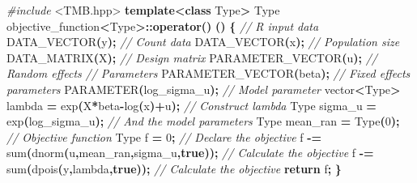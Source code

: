 \documentclass[preprint, 3p, authoryear]{elsarticle} %
\newenvironment{Shaded}{\begin{snugshade}}{\end{snugshade}}
\newcommand{\CommentTok}[1]{\textcolor[rgb]{0.56,0.35,0.01}{\textit{#1}}}
\newcommand{\ControlFlowTok}[1]{\textcolor[rgb]{0.13,0.29,0.53}{\textbf{#1}}}
\newcommand{\DecValTok}[1]{\textcolor[rgb]{0.00,0.00,0.81}{#1}}
\newcommand{\ImportTok}[1]{#1}
\newcommand{\KeywordTok}[1]{\textcolor[rgb]{0.13,0.29,0.53}{\textbf{#1}}}
\newcommand{\NormalTok}[1]{#1}
\newcommand{\OperatorTok}[1]{\textcolor[rgb]{0.81,0.36,0.00}{\textbf{#1}}}
\newcommand{\PreprocessorTok}[1]{\textcolor[rgb]{0.56,0.35,0.01}{\textit{#1}}}
\begin{document}
\begin{Shaded}
\begin{Highlighting}[]
\PreprocessorTok{\#include }\ImportTok{\textless{}TMB.hpp\textgreater{}}
\KeywordTok{template}\OperatorTok{\textless{}}\KeywordTok{class}\NormalTok{ Type}\OperatorTok{\textgreater{}}
\NormalTok{Type objective\_function}\OperatorTok{\textless{}}\NormalTok{Type}\OperatorTok{\textgreater{}::}\KeywordTok{operator}\OperatorTok{()} \OperatorTok{()}
\OperatorTok{\{}
  \CommentTok{// R input data}
\NormalTok{  DATA\_VECTOR}\OperatorTok{(}\NormalTok{y}\OperatorTok{);}                               \CommentTok{// Count data}
\NormalTok{  DATA\_VECTOR}\OperatorTok{(}\NormalTok{x}\OperatorTok{);}                               \CommentTok{// Population size}
\NormalTok{  DATA\_MATRIX}\OperatorTok{(}\NormalTok{X}\OperatorTok{);}                               \CommentTok{// Design matrix}
\NormalTok{  PARAMETER\_VECTOR}\OperatorTok{(}\NormalTok{u}\OperatorTok{);}                          \CommentTok{// Random effects}
  \CommentTok{// Parameters}
\NormalTok{  PARAMETER\_VECTOR}\OperatorTok{(}\NormalTok{beta}\OperatorTok{);}                       \CommentTok{// Fixed effects parameters}
\NormalTok{  PARAMETER}\OperatorTok{(}\NormalTok{log\_sigma\_u}\OperatorTok{);}                       \CommentTok{// Model parameter}
\NormalTok{  vector}\OperatorTok{\textless{}}\NormalTok{Type}\OperatorTok{\textgreater{}}\NormalTok{ lambda  }\OperatorTok{=}\NormalTok{ exp}\OperatorTok{(}\NormalTok{X}\OperatorTok{*}\NormalTok{beta}\OperatorTok{{-}}\NormalTok{log}\OperatorTok{(}\NormalTok{x}\OperatorTok{)+}\NormalTok{u}\OperatorTok{);}  \CommentTok{// Construct \textquotesingle{}lambda\textquotesingle{}}
\NormalTok{  Type sigma\_u }\OperatorTok{=}\NormalTok{ exp}\OperatorTok{(}\NormalTok{log\_sigma\_u}\OperatorTok{);}              \CommentTok{// And the model parameters}
\NormalTok{  Type mean\_ran }\OperatorTok{=}\NormalTok{ Type}\OperatorTok{(}\DecValTok{0}\OperatorTok{);}
  \CommentTok{// Objective function}
\NormalTok{  Type f }\OperatorTok{=} \DecValTok{0}\OperatorTok{;}                                   \CommentTok{// Declare the objective}
\NormalTok{  f }\OperatorTok{{-}=}\NormalTok{ sum}\OperatorTok{(}\NormalTok{dnorm}\OperatorTok{(}\NormalTok{u}\OperatorTok{,}\NormalTok{mean\_ran}\OperatorTok{,}\NormalTok{sigma\_u}\OperatorTok{,}\KeywordTok{true}\OperatorTok{));}     \CommentTok{// Calculate the objective}
\NormalTok{  f }\OperatorTok{{-}=}\NormalTok{ sum}\OperatorTok{(}\NormalTok{dpois}\OperatorTok{(}\NormalTok{y}\OperatorTok{,}\NormalTok{lambda}\OperatorTok{,}\KeywordTok{true}\OperatorTok{));}               \CommentTok{// Calculate the objective}
  \ControlFlowTok{return}\NormalTok{ f}\OperatorTok{;}
\OperatorTok{\}}
\end{Highlighting}
\end{Shaded}
\end{document}
